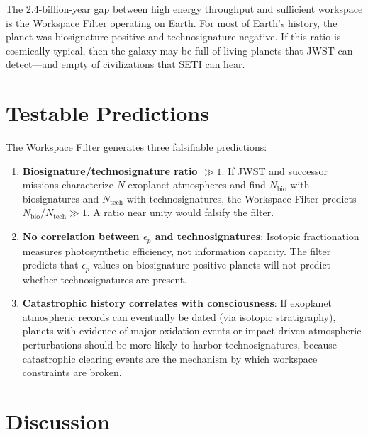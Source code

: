 \documentclass[10pt,letterpaper]{article}
\begin{document}
The 2.4-billion-year gap between high energy throughput and sufficient
workspace is the Workspace Filter operating on Earth. For most of
Earth's history, the planet was biosignature-positive and
technosignature-negative. If this ratio is cosmically typical, then the
galaxy may be full of living planets that JWST can detect---and empty
of civilizations that SETI can hear.

\section*{Testable Predictions}

The Workspace Filter generates three falsifiable predictions:

\begin{enumerate}
\item \textbf{Biosignature/technosignature ratio $\gg 1$}: If JWST and
successor missions characterize $N$ exoplanet atmospheres and find
$N_{\text{bio}}$ with biosignatures and $N_{\text{tech}}$ with
technosignatures, the Workspace Filter predicts
$N_{\text{bio}} / N_{\text{tech}} \gg 1$. A ratio near unity
would falsify the filter.

\item \textbf{No correlation between $\epsilon_p$ and technosignatures}:
Isotopic fractionation measures photosynthetic efficiency, not
information capacity. The filter predicts that $\epsilon_p$ values
on biosignature-positive planets will not predict whether
technosignatures are present.

\item \textbf{Catastrophic history correlates with consciousness}:
If exoplanet atmospheric records can eventually be dated (via
isotopic stratigraphy), planets with evidence of major oxidation
events or impact-driven atmospheric perturbations should be more
likely to harbor technosignatures, because catastrophic clearing
events are the mechanism by which workspace constraints are broken.
\end{enumerate}

\section*{Discussion}
\end{document}
